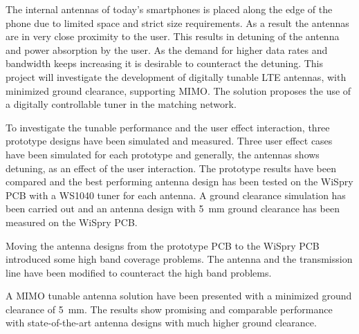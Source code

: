 \noindent
The internal antennas of today's smartphones is placed along the edge of the phone due to limited space and strict size requirements. As a result the antennas are in very close proximity to the user. This results in detuning of the antenna and power absorption by the user. As the demand for higher data rates and bandwidth keeps increasing it is desirable to counteract the detuning.     
This project will investigate the development of digitally tunable LTE antennas, with minimized ground clearance, supporting MIMO.
The solution proposes the use of a digitally controllable tuner in the
matching network.

To investigate the tunable performance and the user effect interaction, three prototype designs have been simulated and measured. Three user effect cases have been simulated for each prototype and generally, the antennas shows detuning, as an effect of the user interaction. 
The prototype results have been compared and the best performing antenna design has been tested on the WiSpry PCB with a WS1040 tuner for each antenna.
A ground clearance simulation has been carried out and an antenna design with \SI{5}{mm} ground clearance has been measured on the WiSpry PCB.  

Moving the antenna designs from the prototype PCB to the WiSpry PCB introduced some high band coverage problems. The antenna and the transmission line have been modified to counteract the high band problems.  

A MIMO tunable antenna solution have been presented with a minimized ground clearance of \SI{5}{mm}. The results show promising and comparable performance with state-of-the-art antenna designs with much higher ground clearance.    

